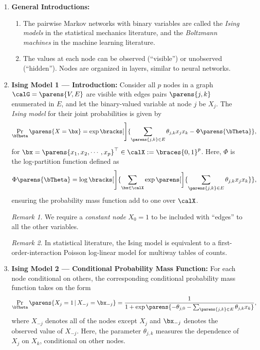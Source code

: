 \documentclass[12pt]{article}
\begin{document}
\begin{enumerate}[label=\textbf{\arabic*.}]

	\item \textbf{General Introductions:} 
	\begin{enumerate}
		\item The pairwise Markov networks with binary variables are called the \textit{Ising models} in the statistical mechanics literature, and the \textit{Boltzmann machines} in the machine learning literature. 
		\item The values at each node can be observed (``visible'') or unobserved (``hidden''). Nodes are organized in layers, similar to neural networks. 
	\end{enumerate}
	
	\item \textbf{Ising Model 1 --- Introduction:} Consider all $p$ nodes in a graph $\calG = \parens{V, E}$ are visible with edges pairs $\parens{j, k}$ enumerated in $E$, and let the binary-valued variable at node $j$ be $X_j$. The \textit{Ising model} for their joint probabilities is given by 
	\begin{align}
		\Pr_{\bTheta} \parens{X = \bx} = \exp \bracks[\Bigg]{\sum_{ \parens{j, k} \in E} \theta_{j,k} x_j x_k - \Phi \parens{\bTheta}}, 
	\end{align}
	for $\bx = \parens{x_1, x_2, \cdots, x_p}^\top \in \calX := \braces{0, 1}^p$. Here, $\Phi$ is the log-partition function defined as 
	\begin{align}
		\Phi \parens{\bTheta} = \log \bracks[\Bigg]{\sum_{\bx \in \calX} \exp \parens[\bigg]{\sum_{\parens{j, k} \in E} \theta_{j, k} x_j x_k}}, 
	\end{align}
	ensuring the probability mass function add to one over $\calX$. 
	
	\textit{Remark 1.} We require a \textit{constant node} $X_0 = 1$ to be included with ``edges'' to all the other variables. 
	
	\textit{Remark 2.} In statistical literature, the Ising model is equivalent to a first-order-interaction Poisson log-linear model for multiway tables of counts. 
	
	\item \textbf{Ising Model 2 --- Conditional Probability Mass Function:} For each node conditional on others, the corresponding conditional probability mass function takes on the form 
	\begin{align}
		\Pr_{\bTheta} \parens{X_j = 1 \,\vert\, X_{-j} = \bx_{-j}} = \frac{1}{1 + \exp \parens{-\theta_{j,0} - \sum_{\parens{j, k} \in E} \theta_{j, k} x_k}}, 
	\end{align}
	where $X_{-j}$ denotes all of the nodes except $X_j$ and $\bx_{-j}$ denotes the observed value of $X_{-j}$. Here, the parameter $\theta_{j,k}$ measures the dependence of $X_j$ on $X_k$, conditional on other nodes. 
	

\end{enumerate}
\end{document}
